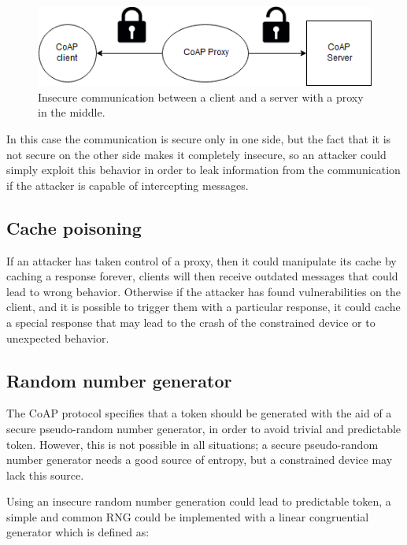 	\begin{figure}
		\includegraphics[width=\linewidth]{coap-vuln-img4.png}
		\caption{Insecure communication between a client and a server with a proxy in the middle.}
		\label{fig:coap-vuln4}
	\end{figure}
	
	In this case the communication is secure only in one side, but the fact that it is not secure on the other side makes it completely insecure, so an attacker could simply exploit this behavior in order to leak information from the communication if the attacker is capable of intercepting messages.\newline
	
	\subsection{Cache poisoning}
	If an attacker has taken control of a proxy, then it could manipulate its cache by caching a response forever, clients will then receive outdated messages that could lead to wrong behavior.\newline
	Otherwise if the attacker has found vulnerabilities on the client, and it is possible to trigger them with a particular response, it could cache a special response that may lead to the crash of the constrained device or to unexpected behavior.
	
	\subsection{Random number generator}
	The CoAP protocol specifies that a token should be generated with the aid of a secure pseudo-random number generator, in order to avoid trivial and predictable token.\newline
	However, this is not possible in all situations; a secure pseudo-random number generator needs a good source of entropy, but a constrained device may lack this source.\newline
	
	Using an insecure random number generation could lead to predictable token, a simple and common RNG could be implemented with a linear congruential generator which is defined as:
	
